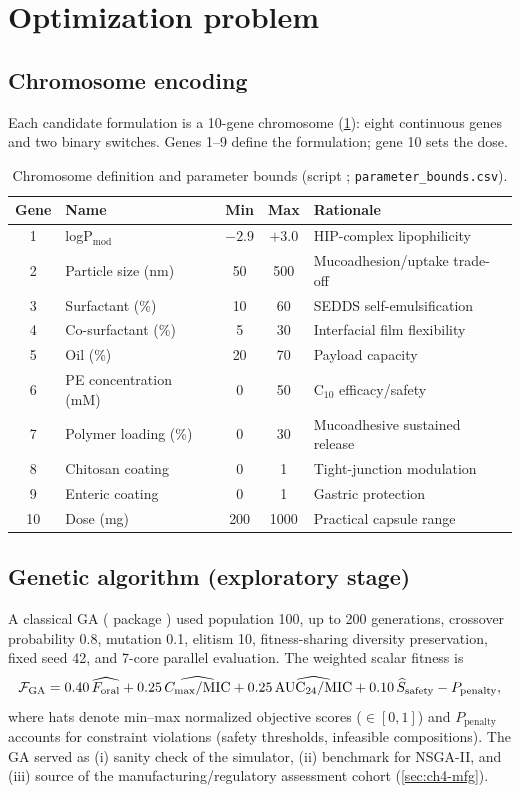 \section{Optimization problem}

\subsection{Chromosome encoding}
\label{sec:chromosome}
Each candidate formulation is a 10-gene chromosome (\cref{tab:bounds}): eight continuous genes and two binary switches. Genes 1--9 define the formulation; gene 10 sets the dose.

\begin{table}[htbp]
\centering
\caption{Chromosome definition and parameter bounds (script ; \texttt{parameter\_bounds.csv}).}
\label{tab:bounds}
\begin{tabular}{clccp{6.6cm}}
\toprule
Gene & Name & Min & Max & Rationale\\
\midrule
1 & logP$_{\mathrm{mod}}$ & $-2.9$ & $+3.0$ & HIP-complex lipophilicity \citep{Asad2023}\\
2 & Particle size (nm) & 50 & 500 & Mucoadhesion/uptake trade-off\\
3 & Surfactant (\%) & 10 & 60 & SEDDS self-emulsification\\
4 & Co-surfactant (\%) & 5 & 30 & Interfacial film flexibility\\
5 & Oil (\%) & 20 & 70 & Payload capacity\\
6 & PE concentration (mM) & 0 & 50 & C$_{10}$ efficacy/safety \citep{Maher2009}\\
7 & Polymer loading (\%) & 0 & 30 & Mucoadhesive sustained release\\
8 & Chitosan coating & 0 & 1 & Tight-junction modulation\\
9 & Enteric coating & 0 & 1 & Gastric protection\\
10 & Dose (mg) & 200 & 1000 & Practical capsule range\\
\bottomrule
\end{tabular}
\end{table}

\subsection{Genetic algorithm (exploratory stage)}
A classical GA ( package \citep{Scrucca2013}) used population 100, up to 200 generations, crossover probability 0.8, mutation 0.1, elitism 10, fitness-sharing diversity preservation, fixed seed 42, and 7-core parallel evaluation. The weighted scalar fitness is
\begin{equation}
\mathcal{F}_{\mathrm{GA}} = 0.40\,\widehat{F_{\mathrm{oral}}} + 0.25\,\widehat{C_{\max}/\mathrm{MIC}} + 0.25\,\widehat{\mathrm{AUC}_{24}/\mathrm{MIC}} + 0.10\,\widehat{S}_{\mathrm{safety}} - P_{\mathrm{penalty}},
\label{eq:fitness}
\end{equation}
where hats denote min--max normalized objective scores ($\in[0,1]$) and $P_{\mathrm{penalty}}$ accounts for constraint violations (safety thresholds, infeasible compositions). The GA served as (i) sanity check of the simulator, (ii) benchmark for NSGA-II, and (iii) source of the manufacturing/regulatory assessment cohort (\cref{sec:ch4-mfg}).

